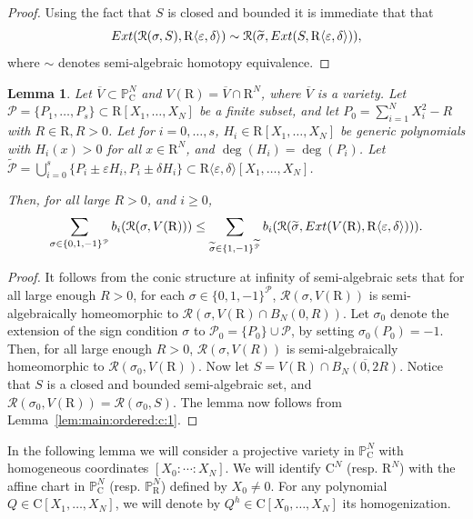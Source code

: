 \documentclass[10pt]{amsart}
\newtheorem{lemma}{Lemma}[section]
\theoremstyle{definition}
\theoremstyle{remark}
\numberwithin{equation}{section}
\newcommand {\R} {\mathrm{R}}
\newcommand {\C}     {\mathrm{C}}
\newcommand {\RR} {{\mathcal R}}
\newcommand {\la}   {{\langle}}
\newcommand {\ra}   {{\rangle}}
\newcommand {\eps} {{\varepsilon}}
\newcommand {\E} {{\rm Ext}}
\newcommand {\PP}     {\mathbb{P}} %
\begin{document}
\begin{proof}
Using the fact that $S$ is closed and bounded it 
is immediate that
that 
  \[
  \E(\RR(\sigma,S),\R\la\eps,\delta\ra) \sim
  \RR(\widetilde{\sigma},\E(S,\R\la\eps,\delta\ra)),
  \]
  where $\sim$ denotes semi-algebraic homotopy equivalence.
\end{proof}

\begin{lemma}
\label{lem:main:ordered:c:2}
    Let $\overline{V} \subset \PP_\C^N$ and 
    $V(\R)  = \overline{V} \cap \R^N$, where
    $\overline{V}$ is a 
    variety. Let
    $\mathcal{P} = \{P_1,\ldots,P_s\} \subset \R[X_1,\ldots,X_N]$ be a finite subset, and let
    $P_0 = \sum_{i=1}^N X_i^2 - R$ with $R \in \R, R>0$.
    Let for $i=0,\ldots,s$, $H_i \in \R[X_1,\ldots,X_N]$ be generic polynomials with $H_i(x) > 0$ for all $x \in \R^N$, and $\deg(H_i) = \deg(P_i)$.
    Let $\widetilde{\mathcal{P}} = \bigcup_{i=0}^{s} \{P_i \pm \eps H_i, P_i \pm \delta H_i\} \subset \R\la\eps,\delta\ra[X_1,\ldots,X_N]$.

    Then, for all large $R > 0$, and $i \geq 0$,
\[
\sum_{\sigma \in \{0,1,-1\}^{\mathcal{P}}} b_i(\RR(\sigma,V(\R))) 
\leq 
\sum_{\widetilde{\sigma} \in \{1,-1\}^{\widetilde{\mathcal{P}}}} b_i(\RR(\widetilde{\sigma},\E(V(\R),\R\la\eps,\delta\ra))). 
\]
\end{lemma}

\begin{proof}
   It follows from the conic structure at infinity of semi-algebraic sets 
   \cite{BCR} that for all large enough $R> 0$, for each $\sigma \in \{0,1,-1\}^{\mathcal{P}}$, $\RR(\sigma, V(\R))$ is semi-algebraically homeomorphic to  $\RR(\sigma, V(\R)\cap B_N(0,R))$. Let $\sigma_0$ denote the extension of the sign condition $\sigma$ to
   $\mathcal{P}_0 = \{P_0\} \cup \mathcal{P}$, by setting $\sigma_0(P_0) = -1$.
   Then, for all large enough $R > 0$, $\RR(\sigma,V(R))$ is semi-algebraically homeomorphic to $\RR(\sigma_0,V(\R))$. Now let $S = V(\R) \cap \overline{B_N(0,2R)}$. Notice that $S$ is a closed and 
   bounded semi-algebraic set, and $\RR(\sigma_0,V(\R)) =
   \RR(\sigma_0,S)$. The lemma now follows from Lemma~\ref{lem:main:ordered:c:1}.
\end{proof}

In the following lemma we will consider a projective variety in $\PP^N_\C$ with homogeneous coordinates
$[X_0:\cdots:X_N]$. We will identify $\C^N$ (resp. $\R^N$) with the affine chart in $\PP^N_\C$ (resp. $\PP^N_\R$) defined by $X_0 \neq 0$. For any polynomial
$Q \in \C[X_1,\ldots,X_N]$, we will denote by $Q^h \in \C[X_0,\ldots,X_N]$ its homogenization.
\end{document}
